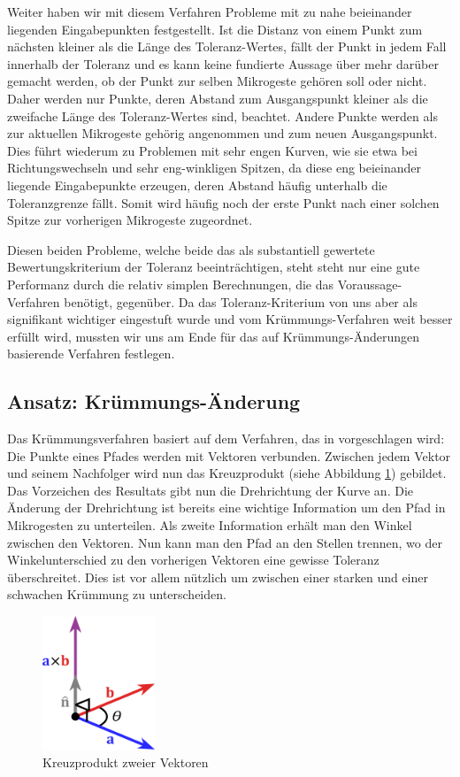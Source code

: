 Weiter haben wir mit diesem Verfahren Probleme mit zu nahe beieinander liegenden Eingabepunkten festgestellt. Ist die Distanz von einem Punkt zum nächsten kleiner als die Länge des Toleranz-Wertes, fällt der Punkt in jedem Fall innerhalb der Toleranz und es kann keine fundierte Aussage über mehr darüber gemacht werden, ob der Punkt zur selben Mikrogeste gehören soll oder nicht. Daher werden nur Punkte, deren Abstand zum Ausgangspunkt kleiner als die zweifache Länge des Toleranz-Wertes sind, beachtet. Andere Punkte werden als zur aktuellen Mikrogeste gehörig angenommen und zum neuen Ausgangspunkt. Dies führt wiederum zu Problemen mit sehr engen Kurven, wie sie etwa bei Richtungswechseln und sehr eng-winkligen Spitzen, da diese eng beieinander liegende Eingabepunkte erzeugen, deren Abstand häufig unterhalb die Toleranzgrenze fällt. Somit wird häufig noch der erste Punkt nach einer solchen Spitze zur vorherigen Mikrogeste zugeordnet.

Diesen beiden Probleme, welche beide das als substantiell gewertete Bewertungskriterium der Toleranz beeinträchtigen, steht steht nur eine gute Performanz durch die relativ simplen Berechnungen, die das Voraussage-Verfahren benötigt, gegenüber. Da das Toleranz-Kriterium von uns aber als signifikant wichtiger eingestuft wurde und vom Krümmungs-Verfahren weit besser erfüllt wird, mussten wir uns am Ende für das auf Krümmungs-Änderungen basierende Verfahren festlegen.


\subsection{Ansatz: Krümmungs-Änderung}
Das Krümmungsverfahren basiert auf dem Verfahren, das in \cite{zeichenerkennung_pa} vorgeschlagen wird: Die Punkte eines Pfades werden mit Vektoren verbunden. Zwischen jedem Vektor und seinem Nachfolger wird nun das Kreuzprodukt (siehe Abbildung \ref{kreuzprodukt}) gebildet. Das Vorzeichen des Resultats gibt nun die Drehrichtung der Kurve an. Die Änderung der Drehrichtung ist bereits eine wichtige Information um den Pfad in Mikrogesten zu unterteilen.
Als zweite Information erhält man den Winkel zwischen den Vektoren. Nun kann man den Pfad an den Stellen trennen, wo der Winkelunterschied zu den vorherigen Vektoren eine gewisse Toleranz überschreitet. Dies ist vor allem nützlich um zwischen einer starken und einer schwachen Krümmung zu unterscheiden.

\begin{figure}[h!]
  \centering
    \includegraphics[width=0.3\textwidth]{./img/crossproduct.pdf}
  \caption{Kreuzprodukt zweier Vektoren}
  \label{kreuzprodukt}
\end{figure}


